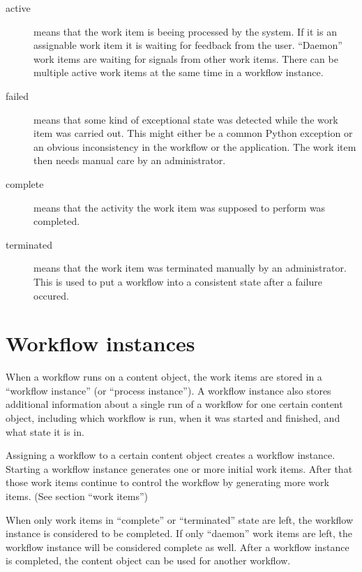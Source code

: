   \begin{description}

    \item[active] means that the work item is beeing processed by the system.
        If it is an assignable work item it is waiting for feedback from the
        user. ``Daemon'' work items are waiting for signals from other work
        items. There can be multiple active work items at the same time in a
        workflow instance.

    \item[failed] means that some kind of exceptional state was detected while
        the work item was carried out. This might either be a common Python
        exception or an obvious inconsistency in the workflow or the
        application. The work item then needs manual care by an administrator.

    \item[complete] means that the activity the work item was supposed to
        perform was completed.

    \item[terminated] means that the work item was terminated manually by an
        administrator. This is used to put a workflow into a consistent state
        after a failure occured.

  \end{description}

\section{Workflow instances}

When a workflow runs on a content object, the work items are stored in a
``workflow instance'' (or ``process instance''). A workflow instance also
stores additional information about a single run of a workflow for one certain
content object, including which workflow is run, when it was started and
finished, and what state it is in.

Assigning a workflow to a certain content object creates a workflow instance.
Starting a workflow instance generates one or more initial work items. After
that those work items continue to control the workflow by generating more work
items. (See section ``work items'')

When only work items in ``complete'' or ``terminated'' state are left, the
workflow instance is considered to be completed. If only ``daemon'' work items
are left, the workflow instance will be considered complete as well.  After a
workflow instance is completed, the content object can be used for another
workflow.

